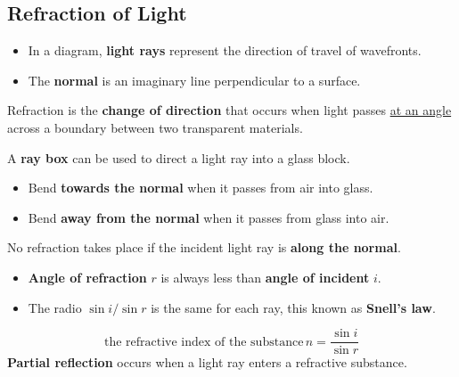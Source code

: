 \subsection{Refraction of Light}

\begin{itemize}
    \item In a diagram, \textbf{light rays} represent the direction of travel of wavefronts.
    \item The \textbf{normal} is an imaginary line perpendicular to a surface.
\end{itemize}

Refraction is the \textbf{change of direction} that occurs when light passes \underline{at an angle} across a boundary between two transparent materials.

A \textbf{ray box} can be used to direct a light ray into a glass block.
\begin{itemize}
    \item Bend \textbf{towards the normal} when it passes from air into glass.
    \item Bend \textbf{away from the normal} when it passes from glass into air.
\end{itemize}
No refraction takes place if the incident light ray is \textbf{along the normal}.
\begin{itemize}
    \item \textbf{Angle of refraction} $r$ is always less than \textbf{angle of incident} $i$.
    \item The radio $\sin i/\sin r$ is the same for each ray, this known as \textbf{Snell's law}.
\end{itemize}
$$\text{the refractive index of the substance}\,n=\frac{\sin i}{\sin r}$$
\textbf{Partial reflection} occurs when a light ray enters a refractive substance.
